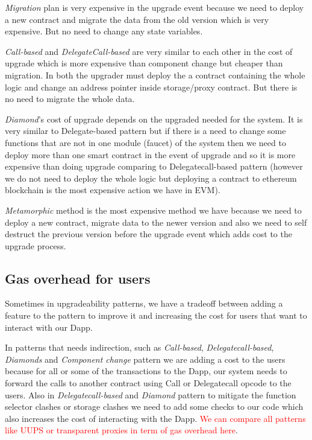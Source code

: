  \textit{Migration} plan is very expensive in the upgrade event because we need to deploy a new contract and migrate the data from the old version which is very expensive. But no need to change any state variables.

 \textit{Call-based} and \textit{DelegateCall-based} are very similar to each other in the cost of upgrade which is more expensive than component change but cheaper than migration. In both the upgrader must deploy the a contract containing the whole logic and change an address pointer inside storage/proxy contract. But there is no need to migrate the whole data.
 
 \textit{Diamond}'s cost of upgrade depends on the upgraded needed for the system. It is very similar to Delegate-based pattern but if there is a need to change some functions that are not in one module (faucet) of the system then we need to deploy more than one smart contract in the event of upgrade and so it is more expensive than doing upgrade comparing to Delegatecall-based pattern (however we do not need to deploy the whole logic but deploying a contract to ethereum blockchain is the most expensive action we have in EVM).

 \textit{Metamorphic} method is the most expensive method we have because we need to deploy a new contract, migrate data to the newer version and also we need to self destruct the previous version before the upgrade event which adds cost to the upgrade process.

\subsection{Gas overhead for users}
Sometimes in upgradeability patterns, we have a tradeoff between adding a feature to the pattern to improve it and increasing the cost for users that want to interact with our Dapp.

In patterns that needs indirection, such as \textit{Call-based}, \textit{Delegatecall-based}, \textit{Diamonds} and \textit{Component change} pattern we are adding a cost to the users because for all or some of the transactions to the Dapp, our system needs to forward the calls to another contract using Call or Delegatecall opcode to the users. 
Also in \textit{Delegatecall-based} and \textit{Diamond} pattern to mitigate the function selector clashes or storage clashes we need to add some checks to our code which also increases the cost of interacting with the Dapp. \textcolor{red}{We can compare all patterns like UUPS or transparent proxies in term of gas overhead here}.

